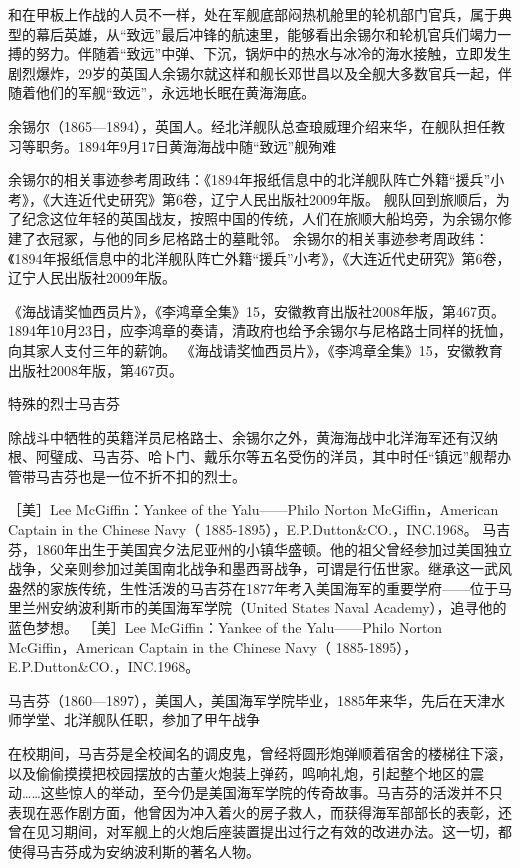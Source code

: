 \documentclass[12pt,UTF8]{ctexbook}
\begin{document}
和在甲板上作战的人员不一样，处在军舰底部闷热机舱里的轮机部门官兵，属于典型的幕后英雄，从“致远”最后冲锋的航速里，能够看出余锡尔和轮机官兵们竭力一搏的努力。伴随着“致远”中弹、下沉，锅炉中的热水与冰冷的海水接触，立即发生剧烈爆炸，29岁的英国人余锡尔就这样和舰长邓世昌以及全舰大多数官兵一起，伴随着他们的军舰“致远”，永远地长眠在黄海海底。


余锡尔（1865—1894），英国人。经北洋舰队总查琅威理介绍来华，在舰队担任教习等职务。1894年9月17日黄海海战中随“致远”舰殉难

余锡尔的相关事迹参考周政纬：《1894年报纸信息中的北洋舰队阵亡外籍“援兵”小考》，《大连近代史研究》第6卷，辽宁人民出版社2009年版。
舰队回到旅顺后，为了纪念这位年轻的英国战友，按照中国的传统，人们在旅顺大船坞旁，为余锡尔修建了衣冠冢，与他的同乡尼格路士的墓毗邻。 余锡尔的相关事迹参考周政纬：《1894年报纸信息中的北洋舰队阵亡外籍“援兵”小考》，《大连近代史研究》第6卷，辽宁人民出版社2009年版。

《海战请奖恤西员片》，《李鸿章全集》15，安徽教育出版社2008年版，第467页。
1894年10月23日，应李鸿章的奏请，清政府也给予余锡尔与尼格路士同样的抚恤，向其家人支付三年的薪饷。 《海战请奖恤西员片》，《李鸿章全集》15，安徽教育出版社2008年版，第467页。

特殊的烈士马吉芬

除战斗中牺牲的英籍洋员尼格路士、余锡尔之外，黄海海战中北洋海军还有汉纳根、阿璧成、马吉芬、哈卜门、戴乐尔等五名受伤的洋员，其中时任“镇远”舰帮办管带马吉芬也是一位不折不扣的烈士。

［美］Lee McGiffin：Yankee of the Yalu——Philo Norton McGiffin，American Captain in the Chinese Navy（ 1885-1895），E.P.Dutton\&CO.，INC.1968。
马吉芬，1860年出生于美国宾夕法尼亚州的小镇华盛顿。他的祖父曾经参加过美国独立战争，父亲则参加过美国南北战争和墨西哥战争，可谓是行伍世家。继承这一武风盎然的家族传统，生性活泼的马吉芬在1877年考入美国海军的重要学府——位于马里兰州安纳波利斯市的美国海军学院（United States Naval Academy），追寻他的蓝色梦想。 ［美］Lee McGiffin：Yankee of the Yalu——Philo Norton McGiffin，American Captain in the Chinese Navy（ 1885-1895），E.P.Dutton\&CO.，INC.1968。


马吉芬（1860—1897），美国人，美国海军学院毕业，1885年来华，先后在天津水师学堂、北洋舰队任职，参加了甲午战争

在校期间，马吉芬是全校闻名的调皮鬼，曾经将圆形炮弹顺着宿舍的楼梯往下滚，以及偷偷摸摸把校园摆放的古董火炮装上弹药，鸣响礼炮，引起整个地区的震动……这些惊人的举动，至今仍是美国海军学院的传奇故事。马吉芬的活泼并不只表现在恶作剧方面，他曾因为冲入着火的房子救人，而获得海军部部长的表彰，还曾在见习期间，对军舰上的火炮后座装置提出过行之有效的改进办法。这一切，都使得马吉芬成为安纳波利斯的著名人物。
\end{document}
